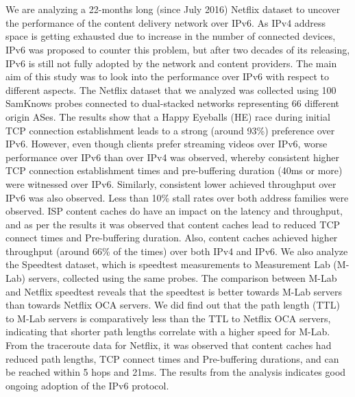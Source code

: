 \chapter{\abstractname}

We are analyzing a 22-months long (since July 2016) Netflix dataset to uncover the
performance of the content delivery network over IPv6. As IPv4 address space is
getting exhausted due to increase in the number of connected devices, IPv6 was proposed
to counter this problem, but after two decades of its releasing, IPv6 is still not fully
adopted by the network and content providers. The main aim of this study was to
look into the performance over IPv6 with respect to different aspects. The Netflix
dataset that we analyzed was collected using 100 SamKnows probes connected to
dual-stacked networks representing 66 different origin ASes. The results show that a
Happy Eyeballs (HE) race during initial TCP connection establishment leads to a strong
(around 93\%) preference over IPv6. However, even though clients prefer streaming
videos over IPv6, worse performance over IPv6 than over IPv4 was observed, whereby
consistent higher TCP connection establishment times and pre-buffering duration (40ms or more) 
were witnessed over IPv6. Similarly, consistent lower achieved throughput over IPv6 was also observed. 
Less than 10\% stall rates over both address families were
observed. ISP content caches do have an impact on the latency and throughput, and as
per the results it was observed that content caches lead to reduced TCP connect times
and Pre-buffering duration. Also, content caches achieved higher throughput (around
66\% of the times) over both IPv4 and IPv6. We also analyze the Speedtest dataset,
which is speedtest measurements to Measurement Lab (M-Lab) servers, collected using
the same probes. The comparison between M-Lab and Netflix speedtest reveals that the
speedtest is better towards M-Lab servers than towards Netflix OCA servers. We did
find out that the path length (TTL) to M-Lab servers is comparatively less than the TTL
to Netflix OCA servers, indicating that shorter path lengths correlate with a higher speed
for M-Lab. From the traceroute data for Netflix, it was observed that content caches
had reduced path lengths, TCP connect times and Pre-buffering durations, and can be
reached within 5 hops and 21ms. The results from the analysis indicates good ongoing
adoption of the IPv6 protocol.


 


